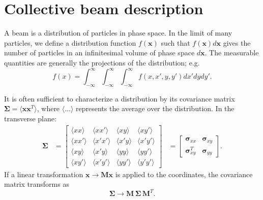 \section{Collective beam description}

A beam is a distribution of particles in phase space. In the limit of many particles, we define a distribution function $f(\mathbf{x})$ such that $f(\mathbf{x}) d\mathbf{x}$ gives the number of particles in an infinitesimal volume of phase space $d\mathbf{x}$. The measurable quantities are generally the projections of the distribution; e.g.
%
\begin{equation}
    f(x) = \int_{-\infty}^{\infty}\int_{-\infty}^{\infty}\int_{-\infty}^{\infty} f(x, x', y, y') dx' dy dy'.
\end{equation}
%

It is often sufficient to characterize a distribution by its covariance matrix {$\bm{\Sigma} = \langle{\mathbf{x}\mathbf{x}^T}\rangle$}, where $\langle{\dots}\rangle$ represents the average over the distribution. In the transverse plane:
%
\begin{equation}\label{eq:covariance_matrix}
\begin{aligned}
    \bm{\Sigma} &= 
    \begin{bmatrix}
        \langle{xx}\rangle & \langle{xx'}\rangle & \langle{xy}\rangle & \langle{xy'}\rangle \\
        \langle{xx'}\rangle & \langle{x'x'}\rangle & \langle{x'y}\rangle & \langle{x'y'}\rangle \\
        \langle{xy}\rangle & \langle{x'y}\rangle & \langle{yy}\rangle & \langle{yy'}\rangle \\
        \langle{xy'}\rangle & \langle{x'y'}\rangle & \langle{yy'}\rangle & \langle{y'y'}\rangle 
    \end{bmatrix}
    &= 
    \begin{bmatrix}
        \bm{\sigma}_{xx} & \bm{\sigma}_{xy} \\
        \bm{\sigma}_{xy}^T & \bm{\sigma}_{yy}
    \end{bmatrix}.
\end{aligned}
\end{equation}
%
If a linear transformation $\mathbf{x} \rightarrow \mathbf{M}\mathbf{x}$ is applied to the coordinates, the covariance matrix transforms as
%
\begin{equation}\label{covariance_matrix_transport}
    \bm{\Sigma} 
    \rightarrow 
    \mathbf{M} \, \bm{\Sigma} \, \mathbf{M}^T.
\end{equation}
